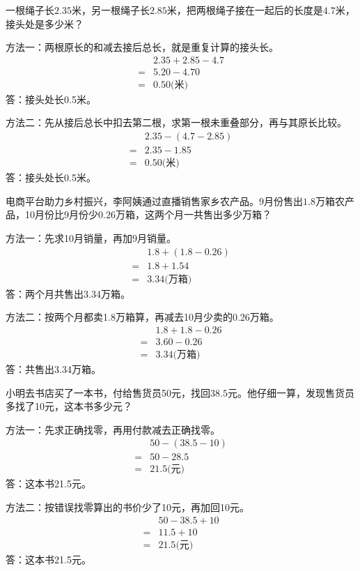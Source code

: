 一根绳子长\(2.35\)米，另一根绳子长\(2.85\)米，把两根绳子接在一起后的长度是\(4.7\)米，接头处是多少米？\par
\begin{BookAnswer}
方法一：两根原长的和减去接后总长，就是重复计算的接头长。\[\begin{aligned}&2.35+2.85-4.7\\={}&5.20-4.70\\={}&0.50\text{(米)}\end{aligned}\]答：接头处长0.5米。\par 方法二：先从接后总长中扣去第二根，求第一根未重叠部分，再与其原长比较。\[\begin{aligned}&2.35-(4.7-2.85)\\={}&2.35-1.85\\={}&0.50\text{(米)}\end{aligned}\]答：接头处长0.5米。
\end{BookAnswer}

电商平台助力乡村振兴，李阿姨通过直播销售家乡农产品。9月份售出\(1.8\)万箱农产品，10月份比9月份少\(0.26\)万箱，这两个月一共售出多少万箱？\par
\begin{BookAnswer}
方法一：先求10月销量，再加9月销量。\[\begin{aligned}&1.8+(1.8-0.26)\\={}&1.8+1.54\\={}&3.34\text{(万箱)}\end{aligned}\]答：两个月共售出3.34万箱。\par 方法二：按两个月都卖1.8万箱算，再减去10月少卖的0.26万箱。\[\begin{aligned}&1.8+1.8-0.26\\={}&3.60-0.26\\={}&3.34\text{(万箱)}\end{aligned}\]答：共售出3.34万箱。
\end{BookAnswer}

小明去书店买了一本书，付给售货员50元，找回\(38.5\)元。他仔细一算，发现售货员多找了10元，这本书多少元？\par
\begin{BookAnswer}
方法一：先求正确找零，再用付款减去正确找零。\[\begin{aligned}&50-(38.5-10)\\={}&50-28.5\\={}&21.5\text{(元)}\end{aligned}\]答：这本书21.5元。\par 方法二：按错误找零算出的书价少了10元，再加回10元。\[\begin{aligned}&50-38.5+10\\={}&11.5+10\\={}&21.5\text{(元)}\end{aligned}\]答：这本书21.5元。
\end{BookAnswer}
